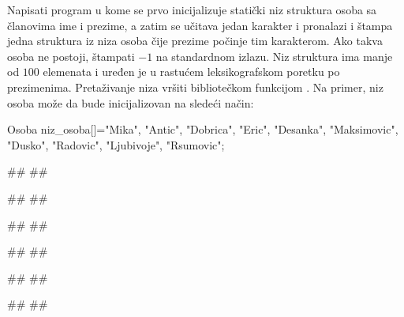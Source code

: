 \begin{Exercise}[label=3-29]
  Napisati program u kome se prvo inicijalizuje statički niz struktura
  osoba sa članovima ime i prezime, a zatim se učitava jedan
  karakter i pronalazi i štampa jedna struktura iz niza osoba čije prezime počinje tim
  karakterom. Ako takva osoba ne postoji, štampati $-1$ na standardnom
  izlazu.
  Niz struktura ima manje od $100$ elemenata i uređen je u rastućem leksikografskom poretku po prezimenima.
  Pretaživanje niza vršiti bibliotečkom funkcijom .
Na primer, niz osoba može da bude inicijalizovan na sledeći način:
\begin{ckod}
Osoba niz_osoba[]={{"Mika", "Antic"},
                   {"Dobrica", "Eric"},
                   {"Desanka", "Maksimovic"},
                   {"Dusko", "Radovic"},
                   {"Ljubivoje", "Rsumovic"}};
\end{ckod}
  
  
\begin{minitest}
\begin{test}{1}
#\naslovUlaz#
##
  
#\naslovIzlaz#
##
\end{test}
\end{minitest}
\begin{minitest}
\begin{test}{2}
#\naslovUlaz#
##
  
#\naslovIzlaz#
##
\end{test}
\end{minitest}
\begin{minitest}
\begin{test}{3}
#\naslovUlaz#
##
  
#\naslovIzlaz#
##
\end{test}
\end{minitest}


\end{Exercise}




